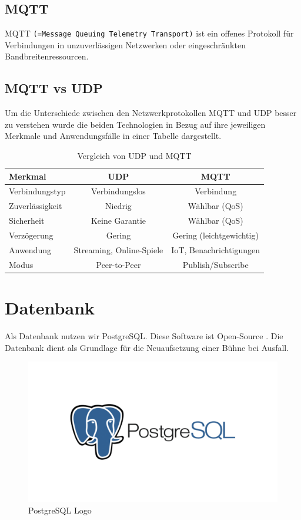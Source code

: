 \subsection{MQTT}
MQTT \texttt{(=Message Queuing Telemetry Transport)} ist ein offenes Protokoll für Verbindungen in unzuverlässigen Netzwerken oder eingeschränkten Bandbreitenressourcen. \parencite{MQTT}

\newpage
\subsection{MQTT vs UDP}
Um die Unterschiede zwischen den Netzwerkprotokollen MQTT und UDP besser zu verstehen wurde die beiden Technologien in Bezug auf ihre jeweiligen Merkmale und Anwendungsfälle in einer Tabelle dargestellt. 

\begin{table}[H]
	\centering
	\begin{tabular}{|l|c|c|}
		\hline
		\textbf{Merkmal} & \textbf{UDP} & \textbf{MQTT} \\
		\hline
		Verbindungstyp & Verbindungslos & Verbindung \\
		\hline
		Zuverlässigkeit & Niedrig & Wählbar (QoS) \\
		\hline
		Sicherheit & Keine Garantie & Wählbar (QoS) \\
		\hline
		Verzögerung & Gering & Gering (leichtgewichtig) \\
		\hline
		Anwendung & Streaming, Online-Spiele & IoT, Benachrichtigungen \\
		\hline
		Modus & Peer-to-Peer & Publish/Subscribe \\
		\hline
	\end{tabular}
	\caption{Vergleich von UDP und MQTT}
	\label{tab:udp_mqtt}
	\textcite{MQTTvsUDP}
\end{table}

\newpage
\section{Datenbank}
Als Datenbank nutzen wir PostgreSQL. Diese Software ist Open-Source \parencite{PostgreSQL}. Die Datenbank dient als Grundlage für die Neuaufsetzung einer Bühne bei Ausfall.

\begin{figure}[H]
	\centering
	\includegraphics[width=0.5\linewidth]{images/postgres-logo.png}
	\caption[PostgreSQL Logo]{PostgreSQL Logo}
	\label{fig:PostgreSQLLogo}
\end{figure}

